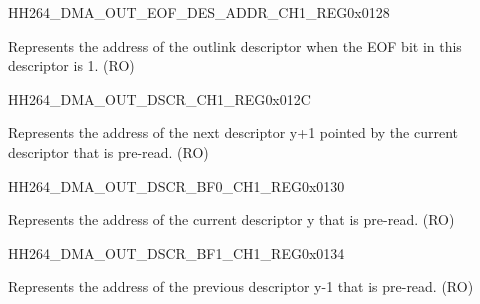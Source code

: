    
    \begin{register}{H}{H264\_DMA\_OUT\_EOF\_DES\_ADDR\_CH1\_REG}{0x0128}\label{regdesc:H264DMAOUTEOFDESADDRCH1REG}
    \regnewline%
    \begin{regdesc}\begin{reglist}
    \label{fielddesc:H264DMAOUTEOFDESADDRCH1}\item [H264\_DMA\_OUT\_EOF\_DES\_ADDR\_CH1] Represents the address of the outlink descriptor when the EOF bit in this descriptor is 1. (RO)
    \end{reglist}\end{regdesc}
    \end{register}
    
    
    \begin{register}{H}{H264\_DMA\_OUT\_DSCR\_CH1\_REG}{0x012C}\label{regdesc:H264DMAOUTDSCRCH1REG}
    \regnewline%
    \begin{regdesc}\begin{reglist}
    \label{fielddesc:H264DMAOUTLINKDSCRCH1}\item [H264\_DMA\_OUTLINK\_DSCR\_CH1] Represents the address of the next descriptor y+1 pointed by the current descriptor that is pre-read. (RO)
    \end{reglist}\end{regdesc}
    \end{register}
    
    
    \begin{register}{H}{H264\_DMA\_OUT\_DSCR\_BF0\_CH1\_REG}{0x0130}\label{regdesc:H264DMAOUTDSCRBF0CH1REG}
    \regnewline%
    \begin{regdesc}\begin{reglist}
    \label{fielddesc:H264DMAOUTLINKDSCRBF0CH1}\item [H264\_DMA\_OUTLINK\_DSCR\_BF0\_CH1] Represents the address of the current descriptor y that is pre-read. (RO)
    \end{reglist}\end{regdesc}
    \end{register}
    
    
    \begin{register}{H}{H264\_DMA\_OUT\_DSCR\_BF1\_CH1\_REG}{0x0134}\label{regdesc:H264DMAOUTDSCRBF1CH1REG}
    \regnewline%
    \begin{regdesc}\begin{reglist}
    \label{fielddesc:H264DMAOUTLINKDSCRBF1CH1}\item [H264\_DMA\_OUTLINK\_DSCR\_BF1\_CH1] Represents the address of the previous descriptor y-1 that is pre-read. (RO)
    \end{reglist}\end{regdesc}
    \end{register}
    
